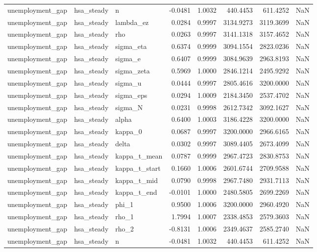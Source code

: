 \begin{tabular}{lllrrrrl}
unemployment\_gap & hsa\_steady & n & -0.0481 & 1.0032 & 440.4453 & 611.4252 & NaN \\
unemployment\_gap & hsa\_steady & lambda\_ez & 0.0284 & 0.9997 & 3134.9273 & 3119.3699 & NaN \\
unemployment\_gap & hsa\_steady & rho & 0.0263 & 0.9997 & 3141.1318 & 3157.4652 & NaN \\
unemployment\_gap & hsa\_steady & sigma\_eta & 0.6374 & 0.9999 & 3094.1554 & 2823.0236 & NaN \\
unemployment\_gap & hsa\_steady & sigma\_e & 0.6407 & 0.9999 & 3084.9639 & 2963.8193 & NaN \\
unemployment\_gap & hsa\_steady & sigma\_zeta & 0.5969 & 1.0000 & 2846.1214 & 2495.9292 & NaN \\
unemployment\_gap & hsa\_steady & sigma\_u & 0.0444 & 0.9997 & 2805.4616 & 3200.0000 & NaN \\
unemployment\_gap & hsa\_steady & sigma\_eps & 0.0294 & 1.0009 & 2184.3450 & 2537.4702 & NaN \\
unemployment\_gap & hsa\_steady & sigma\_N & 0.0231 & 0.9998 & 2612.7342 & 3092.1627 & NaN \\
unemployment\_gap & hsa\_steady & alpha & 0.6400 & 1.0003 & 3186.4228 & 3200.0000 & NaN \\
unemployment\_gap & hsa\_steady & kappa\_0 & 0.0687 & 0.9997 & 3200.0000 & 2966.6165 & NaN \\
unemployment\_gap & hsa\_steady & delta & 0.0302 & 0.9997 & 3089.4405 & 2673.4099 & NaN \\
unemployment\_gap & hsa\_steady & kappa\_t\_mean & 0.0787 & 0.9999 & 2967.4723 & 2830.8753 & NaN \\
unemployment\_gap & hsa\_steady & kappa\_t\_start & 0.1660 & 1.0006 & 2601.6744 & 2709.9588 & NaN \\
unemployment\_gap & hsa\_steady & kappa\_t\_mid & 0.0790 & 0.9998 & 2967.7480 & 2931.7113 & NaN \\
unemployment\_gap & hsa\_steady & kappa\_t\_end & -0.0101 & 1.0000 & 2480.5805 & 2699.2269 & NaN \\
unemployment\_gap & hsa\_steady & phi\_1 & 0.9500 & 1.0006 & 3200.0000 & 2960.4920 & NaN \\
unemployment\_gap & hsa\_steady & rho\_1 & 1.7994 & 1.0007 & 2338.4853 & 2579.3603 & NaN \\
unemployment\_gap & hsa\_steady & rho\_2 & -0.8131 & 1.0006 & 2349.4637 & 2585.2740 & NaN \\
unemployment\_gap & hsa\_steady & n & -0.0481 & 1.0032 & 440.4453 & 611.4252 & NaN \\

\end{tabular}

